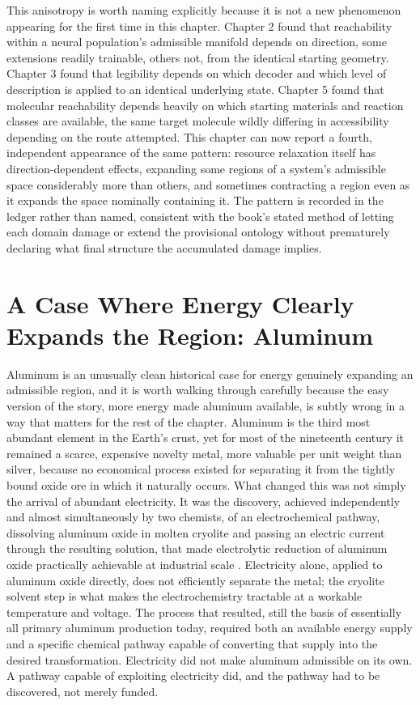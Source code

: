\documentclass[11pt]{book}
\begin{document}
This anisotropy is worth naming explicitly because it is not a new phenomenon appearing for the first time in this chapter. Chapter 2 found that reachability within a neural population's admissible manifold depends on direction, some extensions readily trainable, others not, from the identical starting geometry. Chapter 3 found that legibility depends on which decoder and which level of description is applied to an identical underlying state. Chapter 5 found that molecular reachability depends heavily on which starting materials and reaction classes are available, the same target molecule wildly differing in accessibility depending on the route attempted. This chapter can now report a fourth, independent appearance of the same pattern: resource relaxation itself has direction-dependent effects, expanding some regions of a system's admissible space considerably more than others, and sometimes contracting a region even as it expands the space nominally containing it. The pattern is recorded in the ledger rather than named, consistent with the book's stated method of letting each domain damage or extend the provisional ontology without prematurely declaring what final structure the accumulated damage implies.

\section{A Case Where Energy Clearly Expands the Region: Aluminum}

Aluminum is an unusually clean historical case for energy genuinely expanding an admissible region, and it is worth walking through carefully because the easy version of the story, more energy made aluminum available, is subtly wrong in a way that matters for the rest of the chapter. Aluminum is the third most abundant element in the Earth's crust, yet for most of the nineteenth century it remained a scarce, expensive novelty metal, more valuable per unit weight than silver, because no economical process existed for separating it from the tightly bound oxide ore in which it naturally occurs. What changed this was not simply the arrival of abundant electricity. It was the discovery, achieved independently and almost simultaneously by two chemists, of an electrochemical pathway, dissolving aluminum oxide in molten cryolite and passing an electric current through the resulting solution, that made electrolytic reduction of aluminum oxide practically achievable at industrial scale \cite{grjotheim1993}. Electricity alone, applied to aluminum oxide directly, does not efficiently separate the metal; the cryolite solvent step is what makes the electrochemistry tractable at a workable temperature and voltage. The process that resulted, still the basis of essentially all primary aluminum production today, required both an available energy supply and a specific chemical pathway capable of converting that supply into the desired transformation. Electricity did not make aluminum admissible on its own. A pathway capable of exploiting electricity did, and the pathway had to be discovered, not merely funded.
\end{document}
